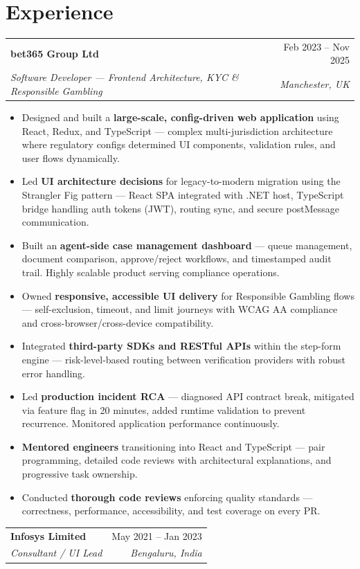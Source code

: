 \documentclass[11pt,a4paper]{article}
\makeatletter
\newcommand{\job}[4]{
\vspace{4pt}
\begin{tabular*}{\textwidth}{l@{\extracolsep{\fill}}r}
\textbf{#1} & #2 \\
\textit{#3} & \textit{#4} \\
\end{tabular*}
\vspace{2pt}
}
\makeatother
\begin{document}
\section*{Experience}

\job
{bet365 Group Ltd}
{Feb 2023 -- Nov 2025}
{Software Developer — Frontend Architecture, KYC \& Responsible Gambling}
{Manchester, UK}

\begin{itemize}
\item Designed and built a \textbf{large-scale, config-driven web application} using React, Redux, and TypeScript — complex multi-jurisdiction architecture where regulatory configs determined UI components, validation rules, and user flows dynamically.
\item Led \textbf{UI architecture decisions} for legacy-to-modern migration using the Strangler Fig pattern — React SPA integrated with .NET host, TypeScript bridge handling auth tokens (JWT), routing sync, and secure postMessage communication.
\item Built an \textbf{agent-side case management dashboard} — queue management, document comparison, approve/reject workflows, and timestamped audit trail. Highly scalable product serving compliance operations.
\item Owned \textbf{responsive, accessible UI delivery} for Responsible Gambling flows — self-exclusion, timeout, and limit journeys with WCAG AA compliance and cross-browser/cross-device compatibility.
\item Integrated \textbf{third-party SDKs and RESTful APIs} within the step-form engine — risk-level-based routing between verification providers with robust error handling.
\item Led \textbf{production incident RCA} — diagnosed API contract break, mitigated via feature flag in 20 minutes, added runtime validation to prevent recurrence. Monitored application performance continuously.
\item \textbf{Mentored engineers} transitioning into React and TypeScript — pair programming, detailed code reviews with architectural explanations, and progressive task ownership.
\item Conducted \textbf{thorough code reviews} enforcing quality standards — correctness, performance, accessibility, and test coverage on every PR.
\end{itemize}

\job
{Infosys Limited}
{May 2021 -- Jan 2023}
{Consultant / UI Lead}
{Bengaluru, India}
\end{document}

